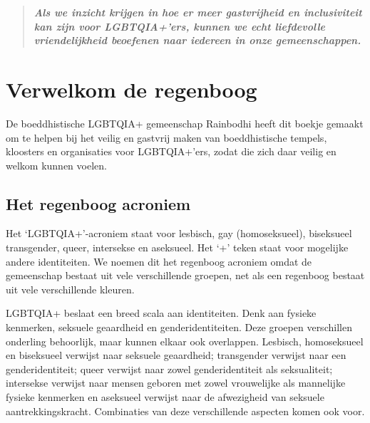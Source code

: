 \documentclass[12pt,openany]{book}
\begin{document}
\begin{quote}
\centering
\doublespacing
\textit{\Large \textbf{Als we inzicht krijgen in hoe er meer gastvrijheid en inclusiviteit kan zijn voor LGBTQIA+'ers, kunnen we echt liefdevolle vriendelijkheid beoefenen naar iedereen in onze gemeenschappen.}}
\end{quote}

\color{darkgray}
\setlength{\parindent}{15pt}
\chapter*{Verwelkom de regenboog}

\begin{figure}
\end{figure}
De boeddhistische LGBTQIA+ gemeenschap Rainbodhi heeft dit boekje gemaakt om  te helpen bij het veilig en gastvrij maken van boeddhistische tempels, kloosters en organisaties voor LGBTQIA+'ers, zodat die zich daar veilig en welkom kunnen voelen.

\section*{Het regenboog acroniem}

Het `LGBTQIA+'-acroniem staat voor lesbisch, gay (homoseksueel), biseksueel transgender, queer, intersekse en aseksueel. Het `+' teken staat voor mogelijke andere identiteiten. We noemen dit het regenboog acroniem omdat de gemeenschap bestaat uit vele verschillende groepen, net als een regenboog bestaat uit vele verschillende kleuren. 

LGBTQIA+ beslaat een breed scala aan identiteiten. Denk aan fysieke kenmerken, seksuele geaardheid en genderidentiteiten. Deze groepen verschillen onderling behoorlijk, maar kunnen elkaar ook overlappen. Lesbisch, homoseksueel en biseksueel verwijst naar seksuele geaardheid; transgender verwijst naar een genderidentiteit; queer verwijst naar zowel genderidentiteit als seksualiteit; intersekse verwijst naar mensen geboren met zowel vrouwelijke als mannelijke fysieke kenmerken en aseksueel verwijst naar de afwezigheid van seksuele aantrekkingskracht. Combinaties van deze verschillende aspecten komen ook voor. 
\end{document}
